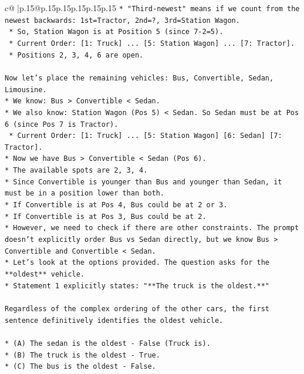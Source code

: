 \documentclass{article}
\begin{document}
{\begin{supertabular}{c@{$\;$}|p{.15\linewidth}@{}p{.15\linewidth}p{.15\linewidth}p{.15\linewidth}p{.15\linewidth}p{.15\linewidth}}
{{{\texttt{*   "Third{-}newest" means if we count from the newest backwards: 1st=Tractor, 2nd=?, 3rd=Station Wagon.} \\
\texttt{    *   So, Station Wagon is at Position 5 (since 7{-}2=5).} \\
\texttt{    *   Current Order: {[}1: Truck{]} ... {[}5: Station Wagon{]} ... {[}7: Tractor{]}.} \\
\texttt{    *   Positions 2, 3, 4, 6 are open.} \\
\\ 
\texttt{Now let's place the remaining vehicles: Bus, Convertible, Sedan, Limousine.} \\
\texttt{*   We know: Bus > Convertible < Sedan.} \\
\texttt{*   We also know: Station Wagon (Pos 5) < Sedan. So Sedan must be at Pos 6 (since Pos 7 is Tractor).} \\
\texttt{    *   Current Order: {[}1: Truck{]} ... {[}5: Station Wagon{]} {[}6: Sedan{]} {[}7: Tractor{]}.} \\
\texttt{*   Now we have Bus > Convertible < Sedan (Pos 6).} \\
\texttt{*   The available spots are 2, 3, 4.} \\
\texttt{*   Since Convertible is younger than Bus and younger than Sedan, it must be in a position lower than both.} \\
\texttt{*   If Convertible is at Pos 4, Bus could be at 2 or 3.} \\
\texttt{*   If Convertible is at Pos 3, Bus could be at 2.} \\
\texttt{*   However, we need to check if there are other constraints. The prompt doesn't explicitly order Bus vs Sedan directly, but we know Bus > Convertible and Convertible < Sedan.} \\
\texttt{*   Let's look at the options provided. The question asks for the **oldest** vehicle.} \\
\texttt{*   Statement 1 explicitly states: "**The truck is the oldest.**"} \\
\\ 
\texttt{Regardless of the complex ordering of the other cars, the first sentence definitively identifies the oldest vehicle.} \\
\\ 
\texttt{*   (A) The sedan is the oldest {-} False (Truck is).} \\
\texttt{*   (B) The truck is the oldest {-} True.} \\
\texttt{*   (C) The bus is the oldest {-} False.} \\
}}}
\end{supertabular}}
\end{document}
